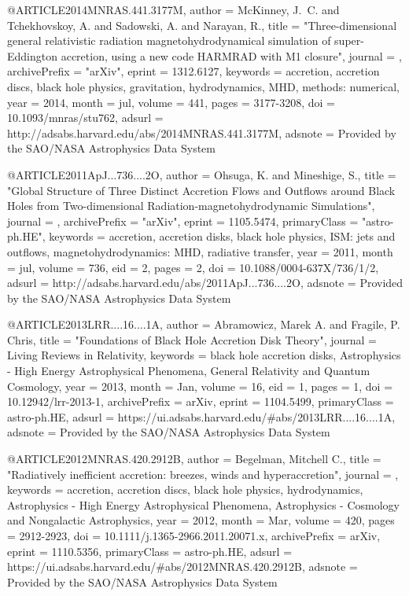 \documentclass[twocolumn,tighten]{aastex63}
\begin{document}
{{{{@ARTICLE{2014MNRAS.441.3177M,
   author = {{McKinney}, J.~C. and {Tchekhovskoy}, A. and {Sadowski}, A. and 
	{Narayan}, R.},
    title = "{Three-dimensional general relativistic radiation magnetohydrodynamical simulation of super-Eddington accretion, using a new code HARMRAD with M1 closure}",
  journal = {\mnras},
archivePrefix = "arXiv",
   eprint = {1312.6127},
 keywords = {accretion, accretion discs, black hole physics, gravitation, hydrodynamics, MHD, methods: numerical},
     year = 2014,
    month = jul,
   volume = 441,
    pages = {3177-3208},
      doi = {10.1093/mnras/stu762},
   adsurl = {http://adsabs.harvard.edu/abs/2014MNRAS.441.3177M},
  adsnote = {Provided by the SAO/NASA Astrophysics Data System}
}

@ARTICLE{2011ApJ...736....2O,
   author = {{Ohsuga}, K. and {Mineshige}, S.},
    title = "{Global Structure of Three Distinct Accretion Flows and Outflows around Black Holes from Two-dimensional Radiation-magnetohydrodynamic Simulations}",
  journal = {\apj},
archivePrefix = "arXiv",
   eprint = {1105.5474},
 primaryClass = "astro-ph.HE",
 keywords = {accretion, accretion disks, black hole physics, ISM: jets and outflows, magnetohydrodynamics: MHD, radiative transfer},
     year = 2011,
    month = jul,
   volume = 736,
      eid = {2},
    pages = {2},
      doi = {10.1088/0004-637X/736/1/2},
   adsurl = {http://adsabs.harvard.edu/abs/2011ApJ...736....2O},
  adsnote = {Provided by the SAO/NASA Astrophysics Data System}
}

@ARTICLE{2013LRR....16....1A,
       author = {{Abramowicz}, Marek A. and {Fragile}, P. Chris},
        title = "{Foundations of Black Hole Accretion Disk Theory}",
      journal = {Living Reviews in Relativity},
     keywords = {black hole accretion disks, Astrophysics - High Energy Astrophysical Phenomena, General Relativity and Quantum Cosmology},
         year = 2013,
        month = Jan,
       volume = {16},
          eid = {1},
        pages = {1},
          doi = {10.12942/lrr-2013-1},
archivePrefix = {arXiv},
       eprint = {1104.5499},
 primaryClass = {astro-ph.HE},
       adsurl = {https://ui.adsabs.harvard.edu/\#abs/2013LRR....16....1A},
      adsnote = {Provided by the SAO/NASA Astrophysics Data System}
}



@ARTICLE{2012MNRAS.420.2912B,
       author = {{Begelman}, Mitchell C.},
        title = "{Radiatively inefficient accretion: breezes, winds and hyperaccretion}",
      journal = {\mnras},
     keywords = {accretion, accretion discs, black hole physics, hydrodynamics, Astrophysics - High Energy Astrophysical Phenomena, Astrophysics - Cosmology and Nongalactic Astrophysics},
         year = 2012,
        month = Mar,
       volume = {420},
        pages = {2912-2923},
          doi = {10.1111/j.1365-2966.2011.20071.x},
archivePrefix = {arXiv},
       eprint = {1110.5356},
 primaryClass = {astro-ph.HE},
       adsurl = {https://ui.adsabs.harvard.edu/\#abs/2012MNRAS.420.2912B},
      adsnote = {Provided by the SAO/NASA Astrophysics Data System}
}


}}}}
\end{document}
